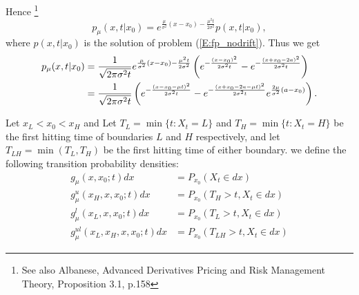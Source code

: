 
Hence
\footnote{See also Albanese, Advanced Derivatives
   Pricing and Risk Management Theory, Proposition 3.1, p.158}
\begin{equation} 
  p_{\mu}(x,t|x_0) = e^{\frac{\mu}{\sigma^2}(x-x_0)-\frac{\mu^2 t}{2\sigma^2}} 
                     p(x,t|x_0),
\end{equation}
where $p(x,t|x_0)$ is the solution of problem (\ref{E:fp_nodrift}).
Thus we get
\begin{align} 
  p_{\mu}(x,t|x_0) 
    &= \frac{1}{\sqrt{2\pi \sigma^2 t}} 
       e^{\frac{\mu}{\sigma^2}(x-x_0)-\frac{\mu^2 t}{2\sigma^2}} 
       \left(  e^{-\frac{(x-x_0)^2}{2\sigma^2 t}} 
          - e^{-\frac{(x+x_0-2a)^2}{2\sigma^2 t}} \right)
       \\ \notag
    &= \frac{1}{\sqrt{2\pi \sigma^2 t}} 
       \left(  e^{-\frac{(x-x_0-\mu t)^2}{2\sigma^2 t}} 
             - e^{-\frac{(x+x_0-2a-\mu t)^2}{2\sigma^2 t}} 
               e^{\frac{2\mu}{\sigma^2} (a-x_0)}
       \right).
\end{align} 

Let $x_L<x_0<x_H$ and 
Let $T_L=\min \{t:X_t=L \}$ and $T_H=\min \{t:X_t=H \}$ be the first hitting
time of boundaries $L$ and $H$ respectively, and let $T_{LH}=\min(T_L,T_H)$ be
the first hitting time of either boundary.
we define the following transition probability densities:
\begin{align}
  g_{\mu}(x,x_0;t) dx &= P_{x_0}( X_t \in dx)  \\
  g^u_{\mu}(x_H,x,x_0;t) dx &= P_{x_0}( T_H>t, X_t \in dx) \\
  g^l_{\mu}(x_L,x,x_0;t) dx &= P_{x_0}( T_L>t, X_t \in dx) \\
  g^{ul}_{\mu}(x_L,x_H,x,x_0;t) dx &= P_{x_0}( T_{LH}>t, X_t \in dx) 
\end{align}

